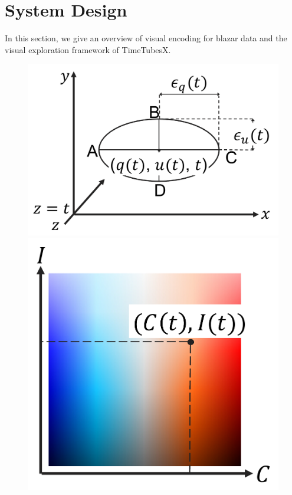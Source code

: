 \section{System Design\label{sec:systemDesign}}
In this section, we give an overview of visual encoding for blazar data and the visual exploration framework of TimeTubesX.

\begin{figure}[tb]
    \begin{minipage}{0.34\linewidth}
        \centering
        \includegraphics[width=.99\linewidth]{vgtc_journal_latex/figures/howtoplot.pdf}
    \end{minipage}
    \begin{minipage}{0.26\linewidth}
        \centering
        \includegraphics[width=.99\linewidth]{vgtc_journal_latex/figures/colormap.pdf}

\end{minipage}
\end{figure}
